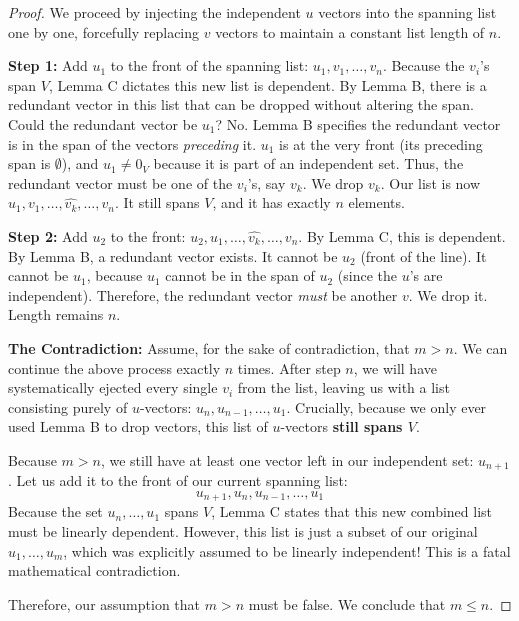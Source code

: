 \begin{proof}
We proceed by injecting the independent $u$ vectors into the spanning list one by one, forcefully replacing $v$ vectors to maintain a constant list length of $n$.

\textbf{Step 1:} Add $u_1$ to the front of the spanning list: $u_1, v_1, \dots, v_n$. Because the $v_i$'s span $V$, Lemma C dictates this new list is dependent. By Lemma B, there is a redundant vector in this list that can be dropped without altering the span. 
Could the redundant vector be $u_1$? No. Lemma B specifies the redundant vector is in the span of the vectors \textit{preceding} it. $u_1$ is at the very front (its preceding span is $\emptyset$), and $u_1 \ne 0_V$ because it is part of an independent set. Thus, the redundant vector must be one of the $v_i$'s, say $v_k$. We drop $v_k$. 
Our list is now $u_1, v_1, \dots, \widehat{v_k}, \dots, v_n$. It still spans $V$, and it has exactly $n$ elements.

\textbf{Step 2:} Add $u_2$ to the front: $u_2, u_1, \dots, \widehat{v_k}, \dots, v_n$. By Lemma C, this is dependent. By Lemma B, a redundant vector exists. It cannot be $u_2$ (front of the line). It cannot be $u_1$, because $u_1$ cannot be in the span of $u_2$ (since the $u$'s are independent). Therefore, the redundant vector \textit{must} be another $v$. We drop it. Length remains $n$.

\textbf{The Contradiction:} Assume, for the sake of contradiction, that $m > n$. 
We can continue the above process exactly $n$ times. After step $n$, we will have systematically ejected every single $v_i$ from the list, leaving us with a list consisting purely of $u$-vectors: $u_n, u_{n-1}, \dots, u_1$. 
Crucially, because we only ever used Lemma B to drop vectors, this list of $u$-vectors \textbf{still spans $V$}. 

Because $m > n$, we still have at least one vector left in our independent set: $u_{n+1}$. Let us add it to the front of our current spanning list:
\[
u_{n+1}, u_n, u_{n-1}, \dots, u_1
\]
Because the set $u_n, \dots, u_1$ spans $V$, Lemma C states that this new combined list must be linearly dependent. However, this list is just a subset of our original $u_1, \dots, u_m$, which was explicitly assumed to be linearly independent! This is a fatal mathematical contradiction.

Therefore, our assumption that $m > n$ must be false. We conclude that $m \le n$.
\end{proof}
